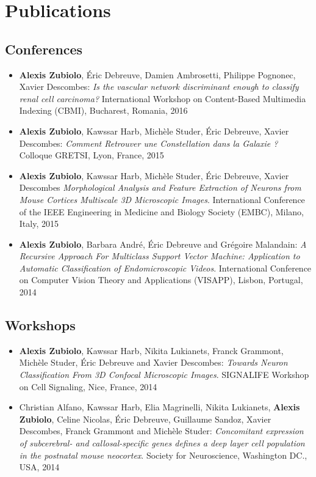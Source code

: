 \documentclass[11pt,a4paper,sans]{moderncv}   %
\begin{document}
\section{Publications}
\subsection{Conferences}
\begin{itemize}
\item \textbf{Alexis Zubiolo}, \'Eric Debreuve, Damien Ambrosetti, Philippe Pognonec, Xavier Descombes: \textit{Is the vascular network discriminant enough to classify renal cell carcinoma?}
International Workshop on Content-Based Multimedia Indexing (CBMI), Bucharest, Romania, 2016
\item \textbf{Alexis Zubiolo}, Kawssar Harb, Mich\`ele Studer, \'Eric Debreuve, Xavier Descombes: \textit{Comment Retrouver une Constellation dans la Galaxie ?}
Colloque GRETSI, Lyon, France, 2015
\item \textbf{Alexis Zubiolo}, Kawssar Harb, Mich\`ele Studer, \'Eric Debreuve, Xavier Descombes
\textit{Morphological Analysis and Feature Extraction of Neurons from Mouse Cortices Multiscale 3D Microscopic Images}.
International Conference of the IEEE Engineering in Medicine and Biology Society (EMBC), Milano, Italy, 2015
\item \textbf{Alexis Zubiolo}, Barbara André, \'Eric Debreuve and Grégoire Malandain:
\textit{A Recursive Approach For Multiclass Support Vector Machine: Application to Automatic Classification of Endomicroscopic Videos}. 
International Conference on Computer Vision Theory and Applications (VISAPP), Lisbon, Portugal, 2014

\end{itemize}

\subsection{Workshops}
\begin{itemize}

\item \textbf{Alexis Zubiolo}, Kawssar Harb, Nikita Lukianets, Franck Grammont, Michèle Studer, Éric Debreuve and Xavier Descombes: \textit{Towards Neuron Classification From 3D Confocal Microscopic Images}.
SIGNALIFE Workshop on Cell Signaling, Nice, France, 2014

\item Christian Alfano, Kawssar Harb, Elia Magrinelli, Nikita Lukianets, \textbf{Alexis Zubiolo}, Celine Nicolas, \'Eric Debreuve, Guillaume Sandoz, Xavier Descombes, Franck Grammont and Mich\`ele Studer: \textit{Concomitant expression of subcerebral- and callosal-specific genes defines a deep layer cell population in the postnatal mouse neocortex}.
Society for Neuroscience, Washington DC., USA, 2014
\end{itemize}
\end{document}
